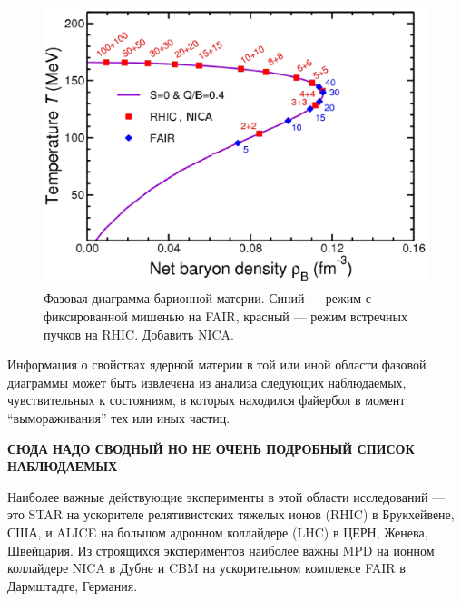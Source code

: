 \begin{figure}[H]
\includegraphics[width=1.0\textwidth]{pictures/Phase_diag.png}
\caption{Фазовая диаграмма барионной материи. Синий --- режим с фиксированной мишенью на FAIR, красный --- режим встречных пучков на RHIC. \todo Добавить NICA. \todo}
\label{fig:PhaseDiagram2}
\end{figure}

Информация о свойствах ядерной материи в той или иной области фазовой диаграммы может быть извлечена из анализа следующих наблюдаемых, чувствительных к состояниям, в которых находился \todo файербол \todo в момент ``вымораживания'' тех или иных частиц.

\textbf{СЮДА НАДО СВОДНЫЙ НО НЕ ОЧЕНЬ ПОДРОБНЫЙ СПИСОК НАБЛЮДАЕМЫХ}

Наиболее важные действующие эксперименты в этой области исследований --- это STAR на ускорителе релятивистских тяжелых ионов (RHIC) в Брукхейвене, США, и ALICE на большом адронном коллайдере (LHC) в ЦЕРН, Женева, Швейцария. Из строящихся экспериментов наиболее важны MPD на ионном коллайдере NICA в Дубне и CBM на ускорительном комплексе FAIR в Дармштадте, Германия.



